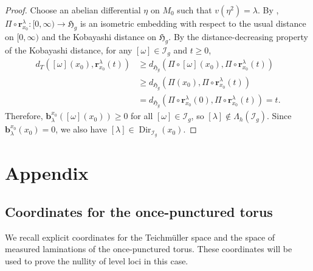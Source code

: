 \documentclass[dvipdfmx]{amsart}
\theoremstyle{remark}
\newcommand{\torelliG}{\mathcal{I}}
\newcommand{\ray}{{\boldsymbol r}}
\newcommand{\pml}{\mathcal{PML}}
\newcommand{\busemann}{\boldsymbol{b}}
\newcommand{\horo}{\mathfrak{horo}}
\begin{document}
\begin{proof}
Choose an abelian differential $\eta$ on $M_0$ such that $v(\eta^2)=\lambda$. By \cite{Kra1981}, $\Pi\circ \ray^\lambda_{x_0}\colon [0,\infty)\to \mathfrak{H}_g$ is an isometric embedding with respect to the usual distance on $[0,\infty)$ and the Kobayashi distance on $\mathfrak{H}_g$.
By the distance-decreasing property of the Kobayashi distance, for any $[\omega]\in \torelliG_g$ and $t\ge 0$,
\begin{align*}
d_T([\omega](x_0),\ray^\lambda_{x_0}(t))
&\ge d_{\mathfrak{H}_g}(\Pi\circ [\omega](x_0),\Pi\circ \ray^\lambda_{x_0}(t)) \\
&\ge d_{\mathfrak{H}_g}(\Pi(x_0),\Pi\circ \ray^\lambda_{x_0}(t)) \\
&= d_{\mathfrak{H}_g}(\Pi\circ \ray^\lambda_{x_0}(0),\Pi\circ \ray^\lambda_{x_0}(t))=t.
\end{align*}
Therefore, $\busemann^{x_0}_\lambda([\omega](x_0))\ge 0$ for all $[\omega]\in\torelliG_g$, so $[\lambda]\notin\Lambda_h(\torelliG_g)$. Since $\busemann^{x_0}_\lambda(x_0)=0$, we also have $[\lambda]\in\operatorname{Dir}_{\torelliG_g}(x_0)$.
\end{proof}




\section{Appendix}

\subsection{Coordinates for the once-punctured torus}

We recall explicit coordinates for the Teichm\"uller
space and the space of measured laminations of the
once-punctured torus.
These coordinates will be used to prove the nullity
of level loci in this case.
\end{document}
